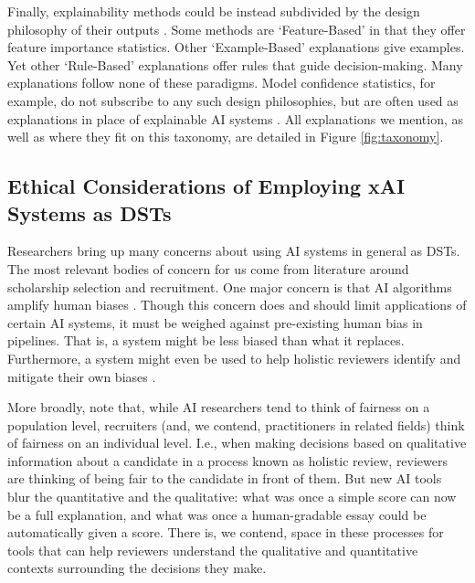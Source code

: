 Finally, explainability methods could be instead subdivided by the design philosophy of their outputs \cite{friedrich_taxonomy_2011}. Some methods are `Feature-Based' in that they offer feature importance statistics. Other `Example-Based' explanations give examples. Yet other `Rule-Based' explanations offer rules that guide decision-making. Many explanations follow none of these paradigms. Model confidence statistics, for example, do not subscribe to any such design philosophies, but are often used as explanations in place of explainable AI systems \cite{zhang_effect_2020}. All explanations we mention, as well as where they fit on this taxonomy, are detailed in Figure \ref{fig:taxonomy}.

\subsection{Ethical Considerations of Employing xAI Systems as DSTs}
Researchers bring up many concerns about using AI systems in general as DSTs. The most relevant bodies of concern for us come from literature around scholarship selection and recruitment. One major concern is that AI algorithms amplify human biases \cite{MikePerkins_JasperRoe_2023}. Though this concern does and should limit applications of certain AI systems, it must be weighed against pre-existing human bias in pipelines. That is, a system might be less biased than what it replaces. Furthermore, a system might even be used to help holistic reviewers identify and mitigate their own biases \cite{alvero_ai_2020}.

More broadly, \textcite{alvero_ai_2020} note that, while AI researchers tend to think of fairness on a population level, recruiters (and, we contend, practitioners in related fields) think of fairness on an individual level. I.e., when making decisions based on qualitative information about a candidate in a process known as holistic review, reviewers are thinking of being fair to the candidate in front of them. But new AI tools blur the quantitative and the qualitative: what was once a simple score can now be a full explanation, and what was once a human-gradable essay could be automatically given a score. There is, we contend, space in these processes for tools that can help reviewers understand the qualitative and quantitative contexts surrounding the decisions they make.

